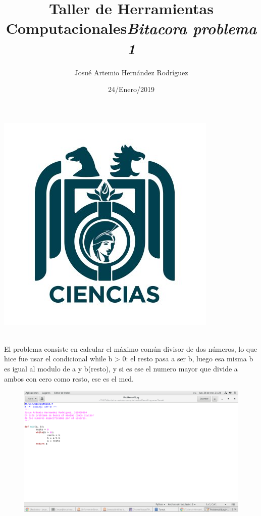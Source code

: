 \label{key}\documentclass[letterpaper, 12pt,oneside]{article}
\title{\Huge Taller de Herramientas Computacionales}
\author{Josué Artemio Hernández Rodríguez}
\date{24/Enero/2019}
\begin{document}
	\maketitle
	\begin{center}
		\includegraphics[scale=0.7]{3.jpg}
	\end{center}

	\newpage
	
	\title{\huge \textit{Bitacora problema 1 }}\\
	El problema consiste en calcular el máximo común divisor de dos números, lo que hice fue usar el condicional while b > 0: el resto pasa a ser b, luego esa misma b es igual al modulo de a y b(resto), y si es ese el numero mayor que divide a ambos con cero como resto, ese es el mcd.
	
	\begin{figure}[h]
		\includegraphics[scale=0.3]{pro01.png}
	\end{figure}

	
	
	
	
	
	
	
	
	
	
	
	
\end{document}
